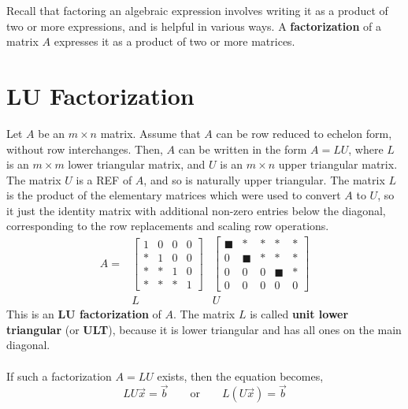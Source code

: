 \documentclass[letterpaper,12pt]{article}
\begin{document}
Recall that factoring an algebraic expression involves writing it as a product of two or more expressions, and is helpful in various ways. A \textbf{factorization} of a matrix $A$ expresses it as a product of two or more matrices.

\section*{LU Factorization}

Let $A$ be an $m \times n$ matrix. Assume that $A$ can be row reduced to echelon form, without row interchanges. Then, $A$ can be written in the form $A = LU$, where $L$ is an $m \times m$ lower triangular matrix, and $U$ is an $m \times n$ upper triangular matrix. The matrix $U$ is a REF of $A$, and so is naturally upper triangular. The matrix $L$ is the product of the elementary matrices which were used to convert $A$ to $U$, so it just the identity matrix with additional non-zero entries below the diagonal, corresponding to the row replacements and scaling row operations.
\begin{equation*}
    \begin{array}{rcc}
        A = & \begin{bmatrix} 1 & 0 & 0 & 0 \\ \ast & 1 & 0 & 0 \\ \ast & \ast & 1 & 0 \\ \ast & \ast & \ast & 1 \end{bmatrix} & \begin{bmatrix} \blacksquare & \ast & \ast & \ast & \ast \\
        0 & \blacksquare & \ast & \ast & \ast \\
        0 & 0 & 0 & \blacksquare & \ast \\
        0 & 0 & 0 & 0 & 0 \end{bmatrix} \\
        & L & U
    \end{array}
\end{equation*}
This is an \textbf{LU factorization} of $A$. The matrix $L$ is called \textbf{unit lower triangular} (or \textbf{ULT}), because it is lower triangular and has all ones on the main diagonal.
\\ \\ If such a factorization $A = LU$ exists, then the equation becomes,
\begin{equation*}
    LU\vec{x} = \vec{b} \qquad \text{or} \qquad L(U\vec{x}) = \vec{b}
\end{equation*}
\end{document}
